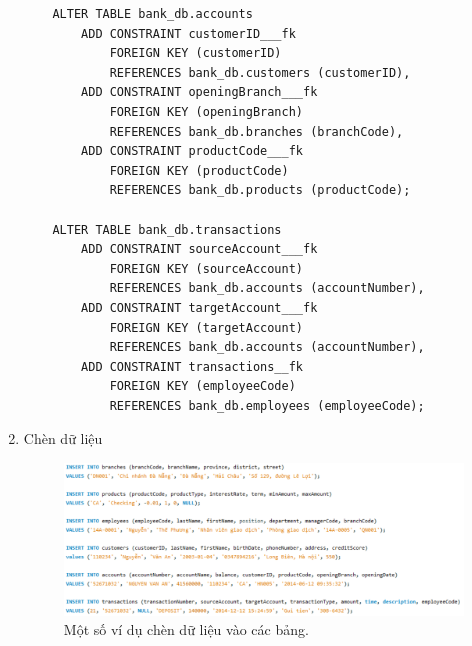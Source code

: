 \begin{enumerate}[label=\alph*.]
\begin{lstlisting}
    ALTER TABLE bank_db.accounts
        ADD CONSTRAINT customerID___fk
            FOREIGN KEY (customerID) 
            REFERENCES bank_db.customers (customerID),
        ADD CONSTRAINT openingBranch___fk
            FOREIGN KEY (openingBranch) 
            REFERENCES bank_db.branches (branchCode),
        ADD CONSTRAINT productCode___fk
            FOREIGN KEY (productCode) 
            REFERENCES bank_db.products (productCode);

    ALTER TABLE bank_db.transactions
        ADD CONSTRAINT sourceAccount___fk
            FOREIGN KEY (sourceAccount) 
            REFERENCES bank_db.accounts (accountNumber),
        ADD CONSTRAINT targetAccount___fk
            FOREIGN KEY (targetAccount) 
            REFERENCES bank_db.accounts (accountNumber),
        ADD CONSTRAINT transactions__fk
            FOREIGN KEY (employeeCode) 
            REFERENCES bank_db.employees (employeeCode);
    \end{lstlisting}

    \item Chèn dữ liệu

    \begin{figure}[H]
        \includegraphics[width=\textwidth]{sample-insert.png}
        \caption{Một số ví dụ chèn dữ liệu vào các bảng.}
        \label{fig:sql-insert}
    \end{figure}
 
\end{enumerate}
